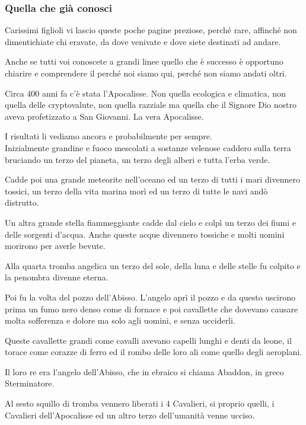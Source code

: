 \documentclass[12pt,a4paper,twoside,openany]{book}
\begin{document}
\begin{multicols}{2}
	


\subsubsection{Quella che già conosci}

Carissimi figlioli vi lascio queste poche pagine preziose, perché rare, affinché non dimentichiate chi eravate, da dove venivate e dove siete destinati ad andare.

Anche se tutti voi conoscete a grandi linee quello che è successo è opportuno chiarire e comprendere il perché noi siamo qui, perché non siamo andati oltri.

Circa 400 anni fa c'è stata l'Apocalisse. Non quella ecologica e climatica, non quella delle cryptovalute, non quella razziale ma quella che il Signore Dio nostro aveva profetizzato a San Giovanni. La vera Apocalisse.

I risultati li vediamo ancora e probabilmente per sempre.\\

Inizialmente grandine e fuoco mescolati a sostanze velenose caddero sulla terra bruciando un terzo del pianeta, un terzo degli alberi e tutta l'erba verde.

Cadde poi una grande meteorite nell'oceano ed un terzo di tutti i mari divennero tossici, un terzo della vita marina morì ed un terzo di tutte le navi andò distrutto.

Un altra grande stella fiammeggiante cadde dal cielo e colpì un terzo dei fiumi e delle sorgenti d'acqua. Anche queste acque divennero tossiche e molti uomini morirono per averle bevute.

Alla quarta tromba angelica un terzo del sole, della luna e delle stelle fu colpito e la penombra divenne eterna.

Poi fu la volta del pozzo dell'Abisso. L'angelo aprì il pozzo e da questo uscirono prima un fumo nero denso come di fornace e poi cavallette che dovevano causare molta sofferenza e dolore ma solo agli uomini, e senza ucciderli.

Queste cavallette grandi come cavalli avevano capelli lunghi e denti da leone, il torace come corazze di ferro ed il rombo delle loro ali come quello degli aeroplani.

Il loro re era l’angelo dell’Abisso, che in ebraico si chiama Abaddon, in greco Sterminatore.

Al sesto squillo di tromba vennero liberati i 4 Cavalieri, si proprio quelli, i Cavalieri dell'Apocalisse ed un altro terzo dell'umanità venne ucciso.


\end{multicols}
\end{document}
